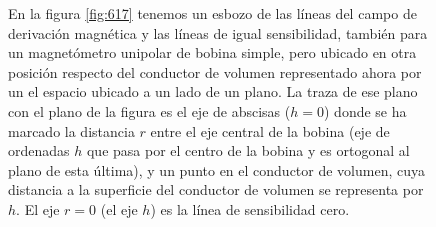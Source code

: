 \begin{figure}[H]
  \begin{minipage}[b]{0.47\textwidth}
  En la figura \ref{fig:617} tenemos un esbozo de las líneas del campo de derivación magnética y las líneas de igual sensibilidad, también para un magnetómetro unipolar de bobina simple, pero ubicado en otra posición respecto del conductor de volumen representado ahora por un el espacio ubicado a un lado de un plano. La traza de ese plano con el plano de la figura es el eje de abscisas ($h=0$) donde se ha marcado la distancia $r$ entre el eje central de la bobina (eje de ordenadas $h$ que pasa por el centro de la bobina y es ortogonal al plano de esta última), y un punto en el conductor de volumen, cuya distancia a la superficie del conductor de volumen se representa por $h$. El eje $r=0$ (el eje $h$) es la línea de sensibilidad cero.
  

\end{minipage}
\end{figure}
